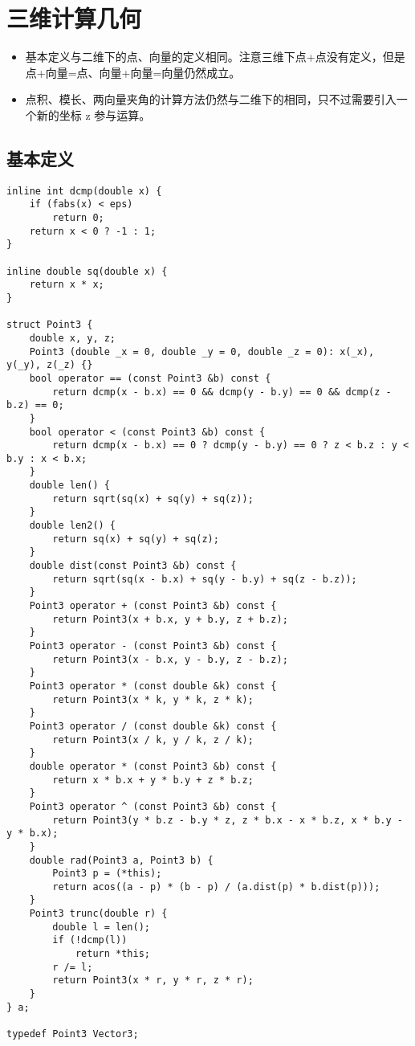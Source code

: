 \section{三维计算几何}

\begin{itemize}
    \item 基本定义与二维下的点、向量的定义相同。注意三维下点+点没有定义，但是点+向量=点、向量+向量=向量仍然成立。
    \item 点积、模长、两向量夹角的计算方法仍然与二维下的相同，只不过需要引入一个新的坐标 z 参与运算。
\end{itemize}

\subsection{基本定义}

\begin{verbatim}
inline int dcmp(double x) {
    if (fabs(x) < eps)
        return 0;
    return x < 0 ? -1 : 1;
}

inline double sq(double x) {
    return x * x;
}

struct Point3 {
    double x, y, z;
    Point3 (double _x = 0, double _y = 0, double _z = 0): x(_x), y(_y), z(_z) {}
    bool operator == (const Point3 &b) const {
        return dcmp(x - b.x) == 0 && dcmp(y - b.y) == 0 && dcmp(z - b.z) == 0;
    }
    bool operator < (const Point3 &b) const {
        return dcmp(x - b.x) == 0 ? dcmp(y - b.y) == 0 ? z < b.z : y < b.y : x < b.x; 
    }
    double len() {
        return sqrt(sq(x) + sq(y) + sq(z));
    }
    double len2() {
        return sq(x) + sq(y) + sq(z);
    }
    double dist(const Point3 &b) const {
        return sqrt(sq(x - b.x) + sq(y - b.y) + sq(z - b.z));
    }
    Point3 operator + (const Point3 &b) const {
        return Point3(x + b.x, y + b.y, z + b.z);
    }
    Point3 operator - (const Point3 &b) const {
        return Point3(x - b.x, y - b.y, z - b.z);
    }
    Point3 operator * (const double &k) const {
        return Point3(x * k, y * k, z * k);
    }
    Point3 operator / (const double &k) const {
        return Point3(x / k, y / k, z / k);
    }
    double operator * (const Point3 &b) const {
        return x * b.x + y * b.y + z * b.z;
    }
    Point3 operator ^ (const Point3 &b) const {
        return Point3(y * b.z - b.y * z, z * b.x - x * b.z, x * b.y - y * b.x);
    }
    double rad(Point3 a, Point3 b) {
        Point3 p = (*this);
        return acos((a - p) * (b - p) / (a.dist(p) * b.dist(p)));
    }
    Point3 trunc(double r) {
        double l = len();
        if (!dcmp(l))
            return *this;
        r /= l;
        return Point3(x * r, y * r, z * r);
    }
} a;

typedef Point3 Vector3;
\end{verbatim}

